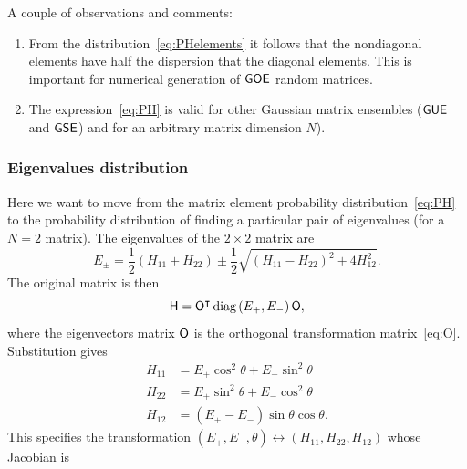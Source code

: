 \documentclass[a4paper,11pt,twoside]{article}
\begin{document}
            A couple of observations and comments:
            \begin{enumerate}
                \item 
                    From the distribution~\eqref{eq:PHelements} it follows that the nondiagonal elements have half the dispersion that the diagonal elements.
                    This is important for numerical generation of $\mathsf{GOE}$ random matrices.

                \item
                    The expression~\eqref{eq:PH} is valid for other Gaussian matrix ensembles ($\mathsf{GUE}$ and $\mathsf{GSE}$) and for an arbitrary matrix dimension $N$).    
            \end{enumerate}

        \subsubsection{Eigenvalues distribution}
            Here we want to move from the matrix element probability distribution~\eqref{eq:PH} to the probability distribution of finding a particular pair of eigenvalues (for a $N=2$ matrix).
            The eigenvalues of the $2\times2$ matrix are
            \begin{equation}
                E_{\pm}=\frac{1}{2}\left(H_{11}+H_{22}\right)\pm\frac{1}{2}\sqrt{\left(H_{11}-H_{22}\right)^{2}+4H_{12}^{2}}.
            \end{equation}
            The original matrix is then
            \begin{equation}
                \mathsf{H}={\mathsf{O}}^{\intercal}\,\text{diag}\left(E_{+},E_{-}\right)\mathsf{O},
            \end{equation}
            where the eigenvectors matrix $\mathsf{O}$ is the orthogonal transformation matrix~\eqref{eq:O}.
            Substitution gives
            \begin{align}
                H_{11}&=E_{+}\cos^{2}\theta+E_{-}\sin^{2}\theta\nonumber\\
                H_{22}&=E_{+}\sin^{2}\theta+E_{-}\cos^{2}\theta\\
                H_{12}&=\left(E_{+}-E_{-}\right)\sin\theta\cos\theta.\nonumber
            \end{align}
            This specifies the transformation $\left(E_{+},E_{-},\theta\right)\leftrightarrow\left(H_{11},H_{22},H_{12}\right)$ whose Jacobian is
\end{document}
